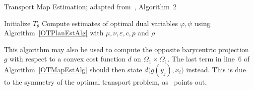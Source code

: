 \begin{algorithm}\label{OTMapEstAlg}
	\caption{Transport Map Estimation; adapted from~\cite{Seg2018}, Algorithm~2}
	Initialize $T_\theta$\;
	Compute estimates of optimal dual variables $\varphi, \psi$ using Algorithm~\ref{OTPlanEstAlg} with $\mu, \nu, \varepsilon, c, p$ and $\rho$\;
\end{algorithm}

This algorithm may also be used to compute the opposite barycentric projection $g$ with respect to a convex cost function $d$ on $\Omega_1 \times \Omega_1$. The last term in line~6 of Algorithm~\ref{OTMapEstAlg} should then state $d\big( g(y_j), x_i \big)$ instead. This is due to the symmetry of the optimal transport problem, as~\cite{Seg2018} points out.